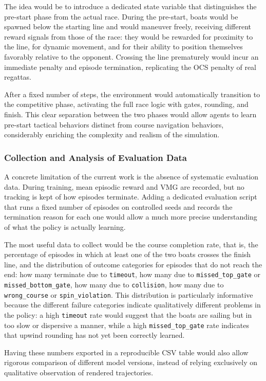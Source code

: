 \documentclass{article}
\begin{document}
The idea would be to introduce a dedicated state variable that distinguishes the pre-start phase from the actual race. During the pre-start, boats would be spawned below the starting line and would maneuver freely, receiving different reward signals from those of the race: they would be rewarded for proximity to the line, for dynamic movement, and for their ability to position themselves favorably relative to the opponent. Crossing the line prematurely would incur an immediate penalty and episode termination, replicating the OCS penalty of real regattas.

After a fixed number of steps, the environment would automatically transition to the competitive phase, activating the full race logic with gates, rounding, and finish. This clear separation between the two phases would allow agents to learn pre-start tactical behaviors distinct from course navigation behaviors, considerably enriching the complexity and realism of the simulation.

\subsubsection{Collection and Analysis of Evaluation Data}
A concrete limitation of the current work is the absence of systematic evaluation data. During training, mean episodic reward and VMG are recorded, but no tracking is kept of how episodes terminate. Adding a dedicated evaluation script that runs a fixed number of episodes on controlled seeds and records the termination reason for each one would allow a much more precise understanding of what the policy is actually learning.

The most useful data to collect would be the course completion rate, that is, the percentage of episodes in which at least one of the two boats crosses the finish line, and the distribution of outcome categories for episodes that do not reach the end: how many terminate due to \texttt{timeout}, how many due to \texttt{missed\_top\_gate} or \texttt{missed\_bottom\_gate}, how many due to \texttt{collision}, how many due to \texttt{wrong\_course} or \texttt{spin\_violation}. This distribution is particularly informative because the different failure categories indicate qualitatively different problems in the policy: a high \texttt{timeout} rate would suggest that the boats are sailing but in too slow or dispersive a manner, while a high \texttt{missed\_top\_gate} rate indicates that upwind rounding has not yet been correctly learned.

Having these numbers exported in a reproducible CSV table would also allow rigorous comparison of different model versions, instead of relying exclusively on qualitative observation of rendered trajectories.
\end{document}
